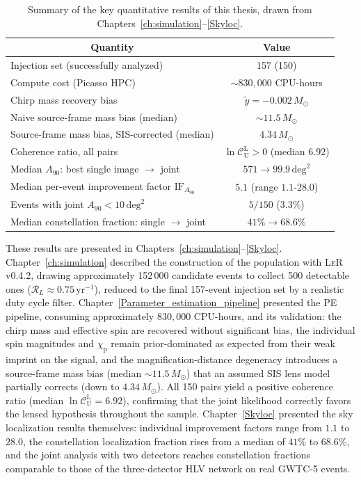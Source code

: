 \begin{table}[h!]
\centering
\renewcommand{\arraystretch}{1.25}
\begin{tabular}{lc}
\hline\hline
\multicolumn{1}{c}{Quantity} & Value \\
\hline
Injection set (successfully analyzed) & 157 (150) \\
Compute cost (Picasso HPC) & $\sim830{,}000$ CPU-hours \\
Chirp mass recovery bias & $\tilde{y}=-0.002\,M_\odot$ \\
Naive source-frame mass bias (median) & $\sim11.5\,M_\odot$ \\
Source-frame mass bias, SIS-corrected (median) & $4.34\,M_\odot$ \\
Coherence ratio, all pairs & $\ln\mathcal{C}_\mathrm{U}^\mathrm{L}>0$ (median $6.92$) \\
Median $A_{90}$: best single image $\to$ joint & $571\to99.9\,\mathrm{deg}^2$ \\
Median per-event improvement factor $\mathrm{IF}_{A_{90}}$ & $5.1$ (range $1.1$-$28.0$) \\
Events with joint $A_{90}<10\,\mathrm{deg}^2$ & $5/150$ ($3.3\%$) \\
Median constellation fraction: single $\to$ joint & $41\%\to68.6\%$ \\
\hline
\end{tabular}
\caption{Summary of the key quantitative results of this thesis, drawn from Chapters~\ref{ch:simulation}--\ref{Skyloc}.}
\label{tab:conclusions_summary}
\end{table}

These results are presented in Chapters~\ref{ch:simulation}--\ref{Skyloc}. Chapter~\ref{ch:simulation} described the construction of the population with \textsc{LeR} v0.4.2, drawing approximately 152\,000 candidate events to collect 500 detectable ones ($\mathcal{R}_L\approx0.75\,\mathrm{yr}^{-1}$), reduced to the final 157-event injection set by a realistic duty cycle filter. Chapter~\ref{Parameter_estimation_pipeline} presented the PE pipeline, consuming approximately $830{,}000$ CPU-hours, and its validation: the chirp mass and effective spin are recovered without significant bias, the individual spin magnitudes and $\chi_\mathrm{p}$ remain prior-dominated as expected from their weak imprint on the signal, and the magnification-distance degeneracy introduces a source-frame mass bias (median $\sim11.5\,M_\odot$) that an assumed SIS lens model partially corrects (down to $4.34\,M_\odot$). All 150 pairs yield a positive coherence ratio (median $\ln\mathcal{C}_\mathrm{U}^\mathrm{L}=6.92$), confirming that the joint likelihood correctly favors the lensed hypothesis throughout the sample. Chapter~\ref{Skyloc} presented the sky localization results themselves: individual improvement factors range from $1.1$ to $28.0$, the constellation localization fraction rises from a median of $41\%$ to $68.6\%$, and the joint analysis with two detectors reaches constellation fractions comparable to those of the three-detector HLV network on real GWTC-5 events.

